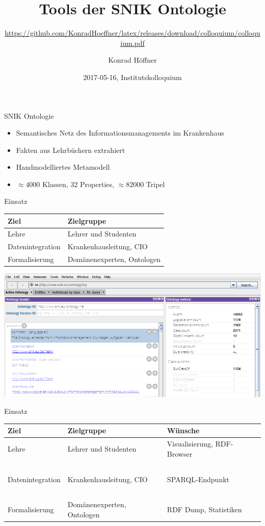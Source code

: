 \documentclass{beamer}
\author{Konrad Höffner}
\date{2017-05-16, Institutskolloquium}
\title{Tools der SNIK Ontologie}
\subtitle{\url{https://github.com/KonradHoeffner/latex/releases/download/colloquium/colloquium.pdf}}
\begin{document}
\begin{frame}
\titlepage
\end{frame}

\begin{frame}{SNIK Ontologie}
\begin{itemize}
\item Semantisches Netz des Informationsmanagements im Krankenhaus
\item Fakten aus Lehrbüchern extrahiert
\item Handmodelliertes Metamodell
\item $\approx \num{4000}$ Klassen, 32 Properties, $\approx \num{82000}$ Tripel
\end{itemize}
\end{frame}

\begin{frame}{Einsatz}
\begin{tabular}{ll}
\toprule
\textbf{Ziel}	&\textbf{Zielgruppe}\\
\midrule
Lehre			&Lehrer und Studenten\\ 
Datenintegration	&Krankenhausleitung, CIO\\
Formalisierung		&Domänenexperten, Ontologen\\
\bottomrule
\end{tabular}
\end{frame}

\begin{frame}
\includegraphics[width=\textwidth]{img/protege.png}
\end{frame}

\begin{frame}{Einsatz}
\begin{tabulary}{\textwidth}{lLL}
\toprule
\textbf{Ziel}		&\textbf{Zielgruppe}		&\textbf{Wünsche}\\
\midrule
Lehre			&Lehrer und Studenten		&Visualisierung, RDF-Browser\\
~\\
Datenintegration	&Krankenhausleitung, CIO	&SPARQL-Endpunkt\\
~\\
Formalisierung		&Domänenexperten, Ontologen	&RDF Dump, Statistiken\\
\bottomrule
\end{tabulary}
\end{frame}
\end{document}
